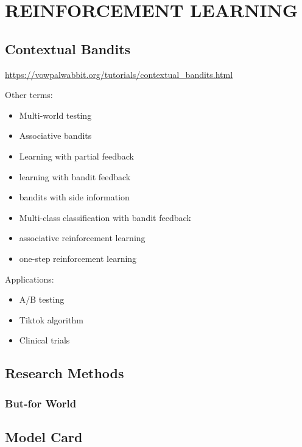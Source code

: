 \documentclass[
]{book}
\begin{document}
\hypertarget{part-reinforcement-learning}{%
\part{REINFORCEMENT LEARNING}\label{part-reinforcement-learning}}

\hypertarget{contextual-bandits}{%
\chapter{Contextual Bandits}\label{contextual-bandits}}

\url{https://vowpalwabbit.org/tutorials/contextual_bandits.html}

Other terms:

\begin{itemize}
\item
  Multi-world testing
\item
  Associative bandits
\item
  Learning with partial feedback
\item
  learning with bandit feedback
\item
  bandits with side information
\item
  Multi-class classification with bandit feedback
\item
  associative reinforcement learning
\item
  one-step reinforcement learning
\end{itemize}

Applications:

\begin{itemize}
\item
  A/B testing
\item
  Tiktok algorithm
\item
  Clinical trials
\end{itemize}

\hypertarget{research-methods}{%
\chapter{Research Methods}\label{research-methods}}

\hypertarget{but-for-world}{%
\section{But-for World}\label{but-for-world}}

\citep{Mahajan_1993}
\citep{Landsman_2020}

\hypertarget{model-card}{%
\chapter{Model Card}\label{model-card}}
\end{document}
